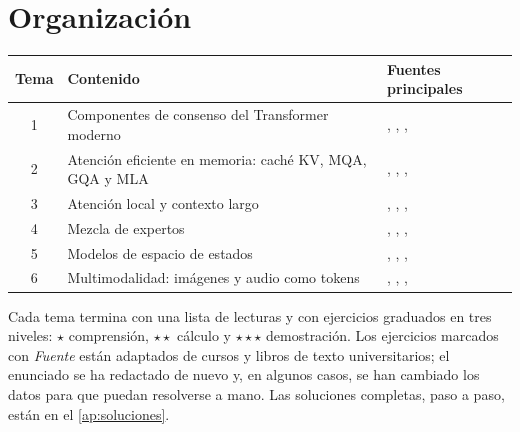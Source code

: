 \documentclass[11pt,a4paper,twoside,openany]{book}
\begin{document}
\section*{Organización}
\begin{center}\small
\begin{tabular}{@{}cll@{}}
\toprule
Tema & Contenido & Fuentes principales \\
\midrule
1 & Componentes de consenso del Transformer moderno & \cite{cs336}, \cite{rmsnorm}, \cite{shazeerglu}, \cite{llama3} \\
2 & Atención eficiente en memoria: caché KV, MQA, GQA y MLA & \cite{mqa}, \cite{gqa}, \cite{deepseekv2}, \cite{cs336} \\
3 & Atención local y contexto largo & \cite{mistral}, \cite{longformer}, \cite{pi}, \cite{yarn} \\
4 & Mezcla de expertos & \cite{shazeer2017}, \cite{switch}, \cite{mixtral}, \cite{deepseekv3} \\
5 & Modelos de espacio de estados & \cite{s4}, \cite{mamba}, \cite{mit6003}, \cite{cs25} \\
6 & Multimodalidad: imágenes y audio como tokens & \cite{vit}, \cite{whisper}, \cite{soundstream}, \cite{d2l} \\
\bottomrule
\end{tabular}
\end{center}

Cada tema termina con una lista de lecturas y con ejercicios graduados en tres niveles: $\star$ comprensión, $\star\star$ cálculo y $\star\star\star$ demostración. Los ejercicios marcados con \emph{Fuente} están adaptados de cursos y libros de texto universitarios; el enunciado se ha redactado de nuevo y, en algunos casos, se han cambiado los datos para que puedan resolverse a mano. Las soluciones completas, paso a paso, están en el \cref{ap:soluciones}.
\end{document}

